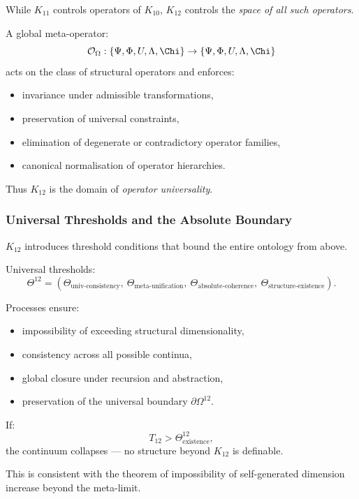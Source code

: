 While $K_{11}$ controls operators of $K_{10}$,
$K_{12}$ controls the \emph{space of all such operators}.

A global meta-operator:
\[
\mathcal{O}_{\Omega} : \{\Psi, \Phi, U, \Lambda, \Chi\} \to 
            \{\Psi, \Phi, U, \Lambda, \Chi\}
\]
acts on the class of structural operators and enforces:
\begin{itemize}
    \item invariance under admissible transformations,
    \item preservation of universal constraints,
    \item elimination of degenerate or contradictory operator families,
    \item canonical normalisation of operator hierarchies.
\end{itemize}

Thus $K_{12}$ is the domain of \emph{operator universality}.

\subsubsection{Universal Thresholds and the Absolute Boundary}

$K_{12}$ introduces threshold conditions that bound 
the entire ontology from above.

Universal thresholds:
\[
\Theta^{12} = 
(\Theta_{\text{univ-consistency}},\
 \Theta_{\text{meta-unification}},\
 \Theta_{\text{absolute-coherence}},\
 \Theta_{\text{structure-existence}}).
\]

Processes ensure:
\begin{itemize}
    \item impossibility of exceeding structural dimensionality,
    \item consistency across all possible continua,
    \item global closure under recursion and abstraction,
    \item preservation of the universal boundary $\partial\Omega^{12}$.
\end{itemize}

If:
\[
T_{12} > \Theta^{12}_{\text{existence}},
\]
the continuum collapses --- no structure beyond $K_{12}$ is definable.

This is consistent with the theorem of impossibility of 
self-generated dimension increase beyond the meta-limit.

